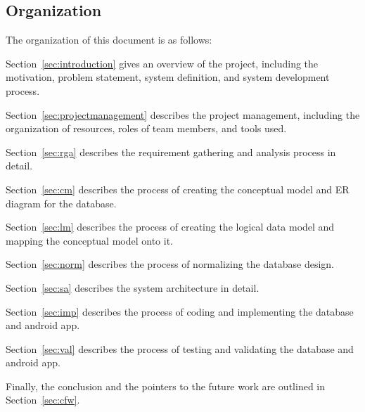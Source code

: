 \subsection{Organization} The organization of this document is as follows:

Section~\ref{sec:introduction} gives an overview of the project, including the motivation, problem statement, system definition, and system development process.

Section~\ref{sec:projectmanagement} describes the project management, including the organization of resources, roles of team members, and tools used.

Section~\ref{sec:rga} describes the requirement gathering and analysis process in detail.

Section~\ref{sec:cm} describes the process of creating the conceptual model and ER diagram for the database.

Section~\ref{sec:lm} describes the process of creating the logical data model and mapping the conceptual model onto it.

Section~\ref{sec:norm} describes the process of normalizing the database design.

Section~\ref{sec:sa} describes the system architecture in detail.

Section~\ref{sec:imp} describes the process of coding and implementing the database and android app.

Section~\ref{sec:val} describes the process of testing and validating the database and android app.

Finally, the conclusion and the pointers to the future work are outlined in Section~\ref{sec:cfw}.




\clearpage